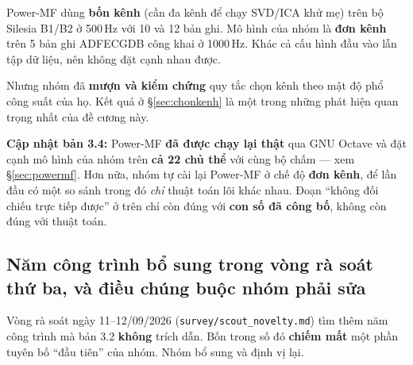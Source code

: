 \begin{canhbao}[title={Vì sao Power-MF không đối chiếu trực tiếp được, và điều nhóm đã học từ họ}]
Power-MF dùng \textbf{bốn kênh} (cần đa kênh để chạy SVD/ICA khử mẹ) trên bộ Silesia B1/B2 ở 500\,Hz với
10 và 12 bản ghi. Mô hình của nhóm là \textbf{đơn kênh} trên 5 bản ghi ADFECGDB công khai ở 1000\,Hz.
Khác cả cấu hình đầu vào lẫn tập dữ liệu, nên không đặt cạnh nhau được.

Nhưng nhóm đã \textbf{mượn và kiểm chứng} quy tắc chọn kênh theo mật độ phổ công suất của họ. Kết quả
ở \S\ref{sec:chonkenh} là một trong những phát hiện quan trọng nhất của đề cương này.

\textbf{Cập nhật bản 3.4:} Power-MF \textbf{đã được chạy lại thật} qua GNU Octave và đặt cạnh mô hình của
nhóm trên \textbf{cả 22 chủ thể} với cùng bộ chấm --- xem \S\ref{sec:powermf}. Hơn nữa, nhóm tự cài lại
Power-MF ở chế độ \textbf{đơn kênh}, để lần đầu có một so sánh trong đó \textit{chỉ} thuật toán lõi khác
nhau. Đoạn ``không đối chiếu trực tiếp được'' ở trên chỉ còn đúng với \textbf{con số đã công bố}, không
còn đúng với thuật toán.
\end{canhbao}

\subsection{Năm công trình bổ sung trong vòng rà soát thứ ba, và điều chúng buộc nhóm phải sửa}
\label{sec:raso3}

Vòng rà soát ngày 11--12/09/2026 (\texttt{survey/scout\_novelty.md}) tìm thêm năm công trình mà bản 3.2
\textbf{không} trích dẫn. Bốn trong số đó \textbf{chiếm mất} một phần tuyên bố ``đầu tiên'' của nhóm.
Nhóm bổ sung và định vị lại.

